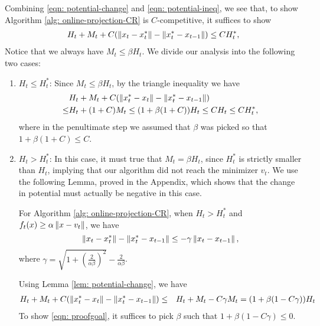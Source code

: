 \noindent Combining \eqref{eqn: potential-change} and \eqref{eqn: potential-ineq}, we see that, to show Algorithm \ref{alg: online-projection-CR} is $C$-competitive, it suffices to show 
\begin{align}
	H_t + M_t + C (\left\lVert x_t - x_t^* \right\rVert - \left\lVert x_t^* - x_{t-1} \right\rVert) \le C H_t^*, \label{eqn: proofgoal}
\end{align}
Notice that we always have $M_t \leq \beta H_t$.  We divide our analysis into the following two cases:
\begin{enumerate}
	\item $H_t \le H_t^*$: Since $M_t \le \beta H_t$, by the triangle inequality we have
	\begin{align*} 
		&H_t + M_t + C (\left\lVert x_t^* - x_t \right\rVert - \left\lVert x_t^* - x_{t-1} \right\rVert) \\
		\le & H_t + (1+C) M_t \le (1 + \beta(1+C))H_t \le CH_t \le CH_t^*,
	\end{align*}
	where in the penultimate step we assumed that $\beta$ was picked so that $ 1+\beta( 1 + C) \le C$. 
	\item $H_t > H_t^*$: In this case, it must true that $M_t = \beta H_t$, since $H_t^*$ is strictly smaller than $H_t$, implying that our algorithm did not reach the minimizer $v_t$.  We use the following Lemma, proved in the Appendix, which shows that the change in potential must actually be negative in this case.

\begin{lemma}
	For Algorithm \ref{alg: online-projection-CR}, when $H_t > H_t^*$ and $f_t(x) \ge \alpha\left\lVert x - v_t \right\rVert$, we have 
	\[ \left\lVert x_t - x_t^* \right\rVert - \left\lVert x_t^* - x_{t-1}  \right\rVert \le -\gamma \left\lVert x_t - x_{t-1} \right\rVert, \]
	where $\gamma = \sqrt{1 + \left( \frac{2}{\alpha\beta}\right)^2} - \frac{2}{\alpha\beta}$.
	\label{lem: potential-change}
\end{lemma}

\noindent Using Lemma \ref{lem: potential-change}, we have 
\begin{align*} 
	&H_t + M_t + C (\left\lVert x_t^* - x_t \right\rVert - \left\lVert x_t^* - x_{t-1} \right\rVert) 
	\le & H_t + M_t - C \gamma M_t = (1 + \beta(1 - C \gamma)) H_t
\end{align*}
To show \eqref{eqn: proofgoal}, it suffices to pick $\beta$ such that $ 1 + \beta \left (1 - C \gamma \right) \le 0$.
\end{enumerate}
